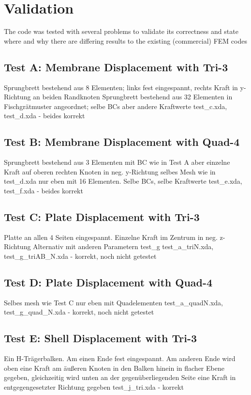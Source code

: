\section{Validation}
The code was tested with several problems to validate its correctness and state where and why there are differing results to the existing (commercial) FEM codes
 \subsection{Test A: Membrane Displacement with Tri-3}
 Sprungbrett bestehend aus 8 Elementen; links fest eingespannt, rechts Kraft in y-Richtung an beiden Randknoten\newline
 Sprungbrett bestehend aus 32 Elementen in Fischgrätmuster angeordnet; selbe BCs aber andere Kraftwerte\newline
 test\_c.xda, test\_d.xda - beides korrekt
 \subsection{Test B: Membrane Displacement with Quad-4}
 Sprungbrett bestehend aus 3 Elementen mit BC wie in Test A aber einzelne Kraft auf oberen rechten Knoten in neg. y-Richtung\newline
 selbes Mesh wie in test\_d.xda nur eben mit 16 Elementen. Selbe BCs, selbe Kraftwerte\newline
 test\_e.xda, test\_f.xda - beides korrekt
 \subsection{Test C: Plate Displacement with Tri-3}
 Platte an allen 4 Seiten eingespannt. Einzelne Kraft im Zentrum in neg. z-Richtung\newline
 Alternativ mit anderen Parametern test\_g\newline
 test\_a\_triN.xda, test\_g\_triAB\_N.xda - korrekt, noch nicht getestet
 \subsection{Test D: Plate Displacement with Quad-4}
 Selbes mesh wie Test C nur eben mit Quadelementen\newline
 test\_a\_quadN.xda, test\_g\_quad\_N.xda - korrekt, noch nicht getestet
 \subsection{Test E: Shell Displacement with Tri-3}
 Ein H-Trägerbalken. Am einen Ende fest eingespannt. Am anderen Ende wird oben eine Kraft am äußeren Knoten in den Balken hinein in flacher Ebene gegeben, gleichzeitig wird unten an der gegenüberliegenden Seite eine Kraft in entgegengesetzter Richtung gegeben\newline
 test\_j\_tri.xda - korrekt
